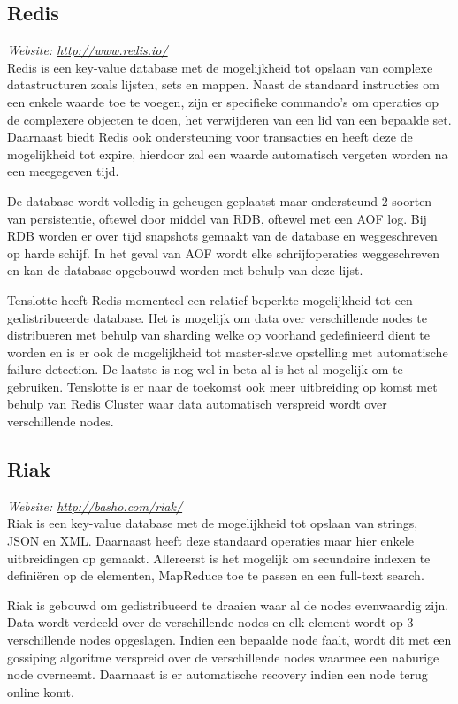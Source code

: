 \subsection{Redis}
\textit{Website: \url{http://www.redis.io/}}\\
Redis is een key-value database met de mogelijkheid tot opslaan van complexe datastructuren zoals lijsten, sets en mappen. Naast de standaard instructies om een enkele waarde toe te voegen, zijn er specifieke commando's om operaties op de complexere objecten te doen, het verwijderen van een lid van een bepaalde set. Daarnaast biedt Redis ook ondersteuning voor transacties en heeft deze de mogelijkheid tot expire, hierdoor zal een waarde automatisch vergeten worden na een meegegeven tijd. 

De database wordt volledig in geheugen geplaatst maar ondersteund 2 soorten van persistentie, oftewel door middel van RDB, oftewel met een AOF log. Bij RDB worden er over tijd snapshots gemaakt van de database en weggeschreven op harde schijf. In het geval van AOF wordt elke schrijfoperaties weggeschreven en kan de database opgebouwd worden met behulp van deze lijst.

Tenslotte heeft Redis momenteel een relatief beperkte mogelijkheid tot een gedistribueerde database. Het is mogelijk om data over verschillende nodes te distribueren met behulp van sharding welke op voorhand gedefinieerd dient te worden en is er ook de mogelijkheid tot master-slave opstelling met automatische failure detection.
De laatste is nog wel in beta al is het al mogelijk om te gebruiken. Tenslotte is er naar de toekomst ook meer uitbreiding op komst met behulp van Redis Cluster waar data automatisch verspreid wordt over verschillende nodes. 

\subsection{Riak}
\textit{Website: \url{http://basho.com/riak/}}\\
Riak is een key-value database met de mogelijkheid tot opslaan van strings, JSON en XML. Daarnaast heeft deze standaard operaties maar hier enkele uitbreidingen op gemaakt. Allereerst is het mogelijk om secundaire indexen te definiëren op de elementen, MapReduce toe te passen en een full-text search. 

Riak is gebouwd om gedistribueerd te draaien waar al de nodes evenwaardig zijn. Data wordt verdeeld over de verschillende nodes en elk element wordt op 3 verschillende nodes opgeslagen. Indien een bepaalde node faalt, wordt dit met een gossiping algoritme verspreid over de verschillende nodes waarmee een naburige node overneemt. Daarnaast is er automatische recovery indien een node terug online komt. 

